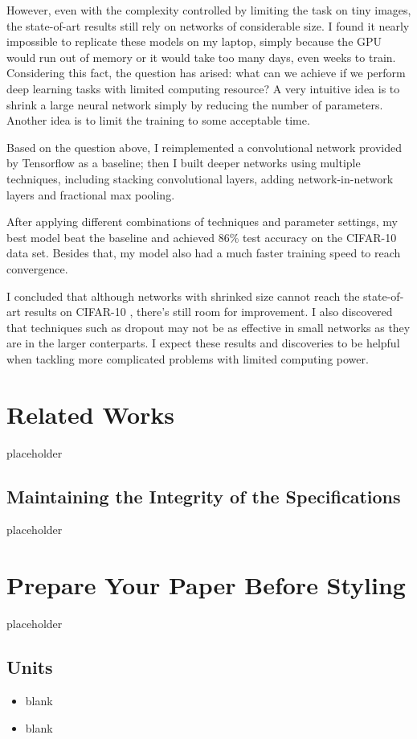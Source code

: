 \documentclass[conference]{IEEEtran}
\begin{document}
However, even with the complexity controlled by limiting the task on tiny images, the state-of-art results still rely on networks of considerable size\cite{frac}. I found it nearly impossible to replicate these models on my laptop, simply because the GPU would run out of memory or it would take too many days, even weeks to train. Considering this fact, the question has arised: what can we achieve if we perform deep learning tasks with limited computing resource? A very intuitive idea is to shrink a large neural network simply by reducing the number of parameters. Another idea is to limit the training to some acceptable time. 

Based on the question above, I reimplemented a convolutional network provided by Tensorflow\cite{tut} as a baseline; then I built deeper networks using multiple techniques, including stacking convolutional layers, adding network-in-network layers and fractional max pooling.

After applying different combinations of techniques and parameter settings, my best model beat the baseline and achieved 86\% test accuracy on the CIFAR-10 data set. Besides that, my model also had a much faster training speed to reach convergence.

I concluded that although networks with shrinked size cannot reach the state-of-art results on CIFAR-10 \cite{leaderboard}, there's still room for improvement. I also discovered that techniques such as dropout may not be as effective in small networks as they are in the larger conterparts. I expect these results and discoveries to be helpful when tackling more complicated problems with limited computing power.

\section{Related Works}
placeholder
\subsection{Maintaining the Integrity of the Specifications}

placeholder

\section{Prepare Your Paper Before Styling}
placeholder


\subsection{Units}
\begin{itemize}
\item blank
\item blank
\end{itemize}
\end{document}
